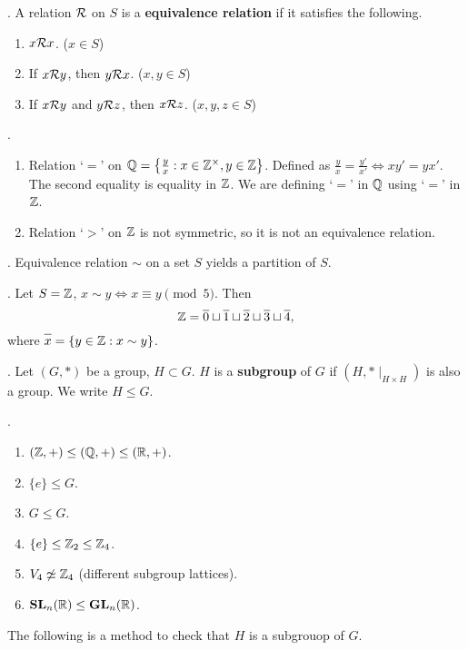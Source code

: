 .  A relation \(\mathcal{R}\) on \(S\) is a \textbf{equivalence relation} if it satisfies the following.
\begin{enumerate}
    \item {} \(x \mathcal{R} x\). (\(x \in S\))
    \item {} If \(x \mathcal{R} y\), then \(y \mathcal{R} x\). (\(x, y \in S\))
    \item {} If \(x \mathcal{R} y\) and \(y \mathcal{R} z\), then \(x \mathcal{R} z\). (\(x, y, z \in S\))
\end{enumerate}

\ex.
\begin{enumerate}
    \item Relation `\(=\)' on \(\mathbb{Q} = \left\{\frac{y}{x} : x \in \mathbb{Z}^\times, y \in \mathbb{Z}\right\}\). Defined as \(\frac{y}{x} = \frac{y'}{x'} \iff xy' = yx'\). The second equality is equality in \(\mathbb{Z}\). We are defining `\(=\)' in \(\mathbb{Q}\) using `\(=\)' in \(\mathbb{Z}\).
    \item Relation `\(>\)' on \(\mathbb{Z}\) is not symmetric, so it is not an equivalence relation.
\end{enumerate}

\thm. Equivalence relation \(\sim\) on a set \(S\) yields a partition of \(S\).

\ex. Let \(S = \mathbb{Z}\), \(x \sim y \iff x \equiv y \pmod 5\). Then
\[
    \Z = \bar{0} \sqcup \bar{1} \sqcup \bar{2} \sqcup \bar{3} \sqcup \bar{4},
\]
where \(\bar{x} = \{y \in \Z : x \sim y\}\).


.  Let \((G, *)\) be a group, \(H \subset G\). \(H\) is a \textbf{subgroup} of \(G\) if \((H, * \mid_{H\times H})\) is also a group. We write \(H \leq G\).

\ex.
\begin{enumerate}
    \item \((\mathbb{Z}, +) \leq (\mathbb{Q}, +) \leq (\mathbb{R}, +)\).
    \item {} \(\{e\} \leq G\).
    \item {} \(G \leq G\).
    \item \(\{e\} \leq \mathbb{Z}_2 \leq \mathbb{Z}_4\).
    \item \(V_4 \not\simeq \mathbb{Z}_4\) (different subgroup lattices).
    \item \(\mathbf{SL}_n(\mathbb{R}) \leq \mathbf{GL}_n(\mathbb{R})\).
\end{enumerate}

The following is a method to check that \(H\) is a subgrouop of \(G\).

